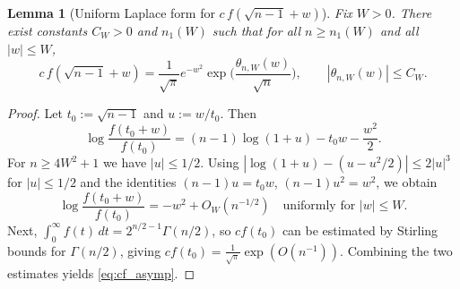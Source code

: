 \documentclass[11pt]{article}
\newtheorem{lemma}[theorem]{Lemma}
\begin{document}
\medskip

\begin{lemma}[Uniform Laplace form for $c\,f(\sqrt{n-1}+w)$]\label{lem:cf}
Fix $W>0$. There exist constants $C_W>0$ and $n_1(W)$ such that for all
$n\ge n_1(W)$ and all $|w|\le W$,
\begin{equation}\label{eq:cf_asymp}
c\,f(\sqrt{n-1}+w)
=
\frac{1}{\sqrt{\pi}}e^{-w^2}\exp\!\Big(\frac{\theta_{n,W}(w)}{\sqrt{n}}\Big),
\qquad |\theta_{n,W}(w)|\le C_W.
\end{equation}
\end{lemma}

\begin{proof}
Let $t_0:=\sqrt{n-1}$ and $u:=w/t_0$. 
Then
\[
\log\frac{f(t_0+w)}{f(t_0)}=(n-1)\log(1+u)-t_0w-\frac{w^2}{2}.
\]
For $n\ge 4W^2+1$ we have $|u|\le 1/2$. Using $|\log(1+u)-(u-u^2/2)|\le 2|u|^3$ for $|u|\le 1/2$ and the identities
$(n-1)u=t_0w$, $(n-1)u^2=w^2$, we obtain
\[
\log\frac{f(t_0+w)}{f(t_0)}=-w^2+O_W(n^{-1/2})
\quad\text{uniformly for }|w|\le W.
\]
Next, $\int_0^\infty f(t)\,dt=2^{n/2-1}\Gamma(n/2)$, so $c f(t_0)$ can be
estimated by Stirling bounds for $\Gamma(n/2)$, giving
$c f(t_0)=\frac{1}{\sqrt{\pi}}\exp(O(n^{-1}))$.
Combining the two estimates yields \eqref{eq:cf_asymp}.
\end{proof}

\medskip
\end{document}
